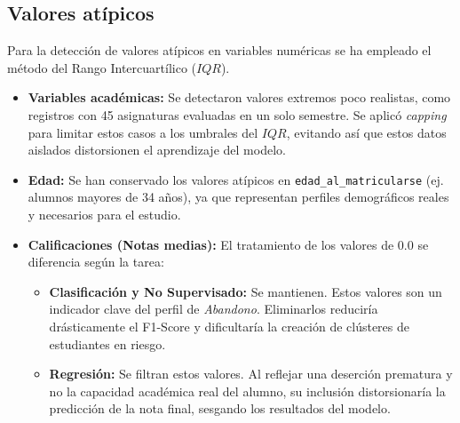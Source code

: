 \documentclass{article}
\begin{document}
\subsection{Valores atípicos}
Para la detección de valores atípicos en variables numéricas se ha empleado el método del Rango 
Intercuartílico ($IQR$).

\begin{itemize}
    \item \textbf{Variables académicas:} Se detectaron valores extremos poco realistas, como registros con 45 asignaturas evaluadas en un solo semestre. Se aplicó \textit{capping} para limitar estos casos a los umbrales del $IQR$, evitando así que estos datos aislados distorsionen el aprendizaje del modelo.
    \item \textbf{Edad:} Se han conservado los valores atípicos en \texttt{edad\_al\_matricularse} (ej. alumnos mayores de 34 años), ya que representan perfiles demográficos reales y necesarios para el estudio.

\item \textbf{Calificaciones (Notas medias):} El tratamiento de los valores de 0.0 se diferencia según la tarea:
\begin{itemize}
    \item \textbf{Clasificación y No Supervisado:} Se mantienen. Estos valores son un indicador clave del perfil de \textit{Abandono}. Eliminarlos reduciría drásticamente el F1-Score y dificultaría la creación de clústeres de estudiantes en riesgo.
    \item \textbf{Regresión:} Se filtran estos valores. Al reflejar una deserción prematura y no la capacidad académica real del alumno, su inclusión distorsionaría la predicción de la nota final, sesgando los resultados del modelo.
\end{itemize}
\end{itemize}
\end{document}
